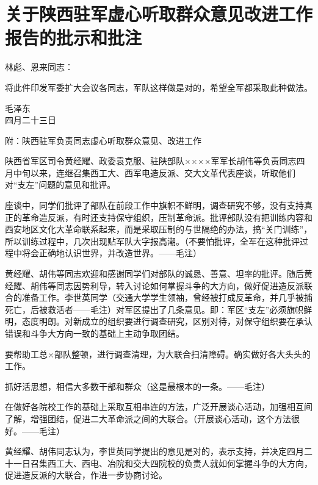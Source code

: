 \section[关于陕西驻军虚心听取群众意见改进工作报告的批示和批注（一九六七年四月二十三日）]{关于陕西驻军虚心听取群众意见改进工作报告的批示和批注}


林彪、恩来同志：

将此件印发军委扩大会议各同志，军队这样做是对的，希望全军都采取此种做法。
{\raggedleft 毛泽东\\四月二十三日\par}

附：陕西驻军负责同志虚心听取群众意见、改进工作

陕西省军区司令黄经耀、政委袁克服、驻陕部队××××军军长胡伟等负责同志四月中旬以来，连继召集西工大、西军电造反派、交大文革代表座谈，听取他们对“支左”问题的意见和批评。

座谈中，同学们批评了部队在前段工作中旗帜不鲜明，调查研究不够，没有支持真正的革命造反派，有时还支持保守组织，压制革命派。批评部队没有把训练内容和西安地区文化大革命联系起来，而是采取压制的与世隔绝的办法，搞“关门训练”，所以训练过程中，几次出现贴军队大字报高潮。（不要怕批评，全军在这种批评过程中将会正确地认识世界，并改造世界。——毛注）

黄经耀、胡伟等同志欢迎和感谢同学们对部队的诚恳、善意、坦率的批评。随后黄经耀、胡伟等同志因势利导，转入讨论如何掌握斗争的大方向，做好促进造反派联合的准备工作。李世英同学（交通大学学生领袖，曾经被打成反革命，并几乎被捕死亡，后被救活者——毛注）对军区提出了几条意见。即：军区“支左”必须旗帜鲜明，态度明朗。对新成立的组织要进行调查研究，区别对待，对保守组织要在承认错误和斗争大方向一致的基础上主动争取团结。

要帮助工总×部队整顿，进行调查清理，为大联合扫清障碍。确实做好各大头头的工作。

抓好活思想，相信大多数干部和群众（这是最根本的一条。——毛注）

在做好各院校工作的基础上采取互相串连的方法，广泛开展谈心活动，加强相互间了解，增强团结，促进二大革命派之间的大联合。（开展谈心活动，这个方法很好。——毛注）

黄经耀、胡伟同志认为，李世英同学提出的意见是对的，表示支持，并决定四月二十一日召集西工大、西电、冶院和交大四院校的负责人就如何掌握斗争的大方向，促进造反派的大联合，作进一步协商讨论。



